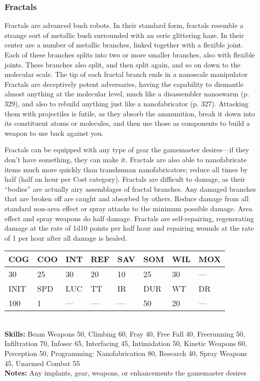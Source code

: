 \subsubsection{Fractals }

Fractals are advanced bush robots. In their standard 
form, fractals resemble a strange sort of metallic 
bush surrounded with an eerie glittering haze. In 
their center are a number of metallic branches, linked 
together with a flexible joint. Each of these branches 
splits into two or more smaller branches, also with 
flexible joints. These branches also split, and then split 
again, and so on down to the molecular scale. The tip 
of each fractal branch ends in a nanoscale manipulator
Fractals are deceptively potent adversaries, having
the capability to dismantle almost anything at the 
molecular level, much like a disassembler nanoswarm 
(p. 329), and also to rebuild anything just like a nanofabricator
(p. 327). Attacking them with projectiles is
futile, as they absorb the ammunition, break it down 
into its constituent atoms or molecules, and then use 
those as components to build a weapon to use back 
against you.

Fractals can be equipped with any type of gear the 
gamemaster desires—if they don't have something, 
they can make it. Fractals are also able to nanofabricate
items much more quickly than transhuman
nanofabricators; reduce all times by half (half an hour 
per Cost category). Fractals are difficult to damage, as 
their ``bodies'' are actually airy assemblages of fractal 
branches. Any damaged branches that are broken off 
are caught and absorbed by others. Reduce damage 
from all standard non-area effect or spray attacks to 
the minimum possible damage. Area effect and spray 
weapons do half damage. Fractals are self-repairing, 
regenerating damage at the rate of 1d10 points per 
half hour and repairing wounds at the rate of 1 per 
hour after all damage is healed.
\\
\begin{tabular}{|l|l|l|l|l|l|l|l|}
\hline
COG & COO & INT & REF & SAV & SOM & WIL & MOX \\
\hline
30 & 25 & 30 & 20 & 10 & 25 & 30 & — \\
\hline
INIT & SPD & LUC & TT & IR & DUR & WT & DR \\
\hline
100 & 1 & — & — & — & 50 & 20 & — \\
\hline
\end{tabular}
\\
\textbf{Skills:} Beam Weapons 50, Climbing 60, Fray 40, Free Fall 40, Freerunning 50, Infiltration 70, Infosec 65, Interfacing 45, Intimidation 50, Kinetic Weapons 60, Perception 50, Programming: Nanofabrication 80, Research 40, Spray Weapons 45, Unarmed Combat 55
\\
\textbf{Notes:} Any implants, gear, weapons, or enhancements the gamemaster desires

